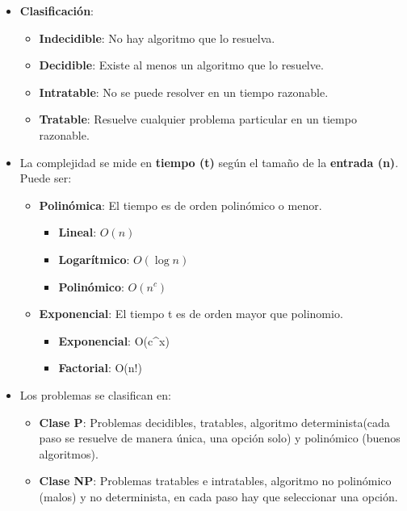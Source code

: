 \documentclass[12pt, twoside, openright]{report} %
\begin{document}
  \begin{itemize}
  \item \textbf{Clasificación}:
    

    \begin{itemize}
    \item \textbf{Indecidible}: No hay algoritmo que lo resuelva.
      
    \item \textbf{Decidible}: Existe al menos un algoritmo que lo resuelve.
      
    \item \textbf{Intratable}: No se puede resolver en un tiempo razonable.
      
    \item \textbf{Tratable}: Resuelve cualquier problema particular en un
      tiempo razonable.
      
    \end{itemize}
  \item La complejidad se mide en \textbf{tiempo (t)} según el tamaño de la
    \textbf{entrada (n)}. Puede ser:
    

    \begin{itemize}
    \item \textbf{Polinómica}: El tiempo es de orden polinómico o menor.
      

      \begin{itemize}
      \item \textbf{Lineal}: $O(n)$
        
      \item \textbf{Logarítmico}: $O(\log n)$
        
      \item \textbf{Polinómico}: $O(n^c)$
        
      \end{itemize}
    \item \textbf{Exponencial}: El tiempo t es de orden mayor que polinomio.
      

      \begin{itemize}
      \item \textbf{Exponencial}: O(c\^{}x)
        
      \item \textbf{Factorial}: O(n!)
        
      \end{itemize}
    \end{itemize}
  \item Los problemas se clasifican en:
    

    \begin{itemize}
    \item \textbf{Clase P}: Problemas decidibles, tratables, algoritmo
      determinista(cada paso se resuelve de manera única, una opción
      solo) y polinómico (buenos algoritmos).
      
    \item \textbf{Clase NP}: Problemas tratables e intratables, algoritmo no
      polinómico (malos) y no determinista, en cada paso hay que seleccionar una opción.
      
    \end{itemize}
  \end{itemize}
\end{document}
